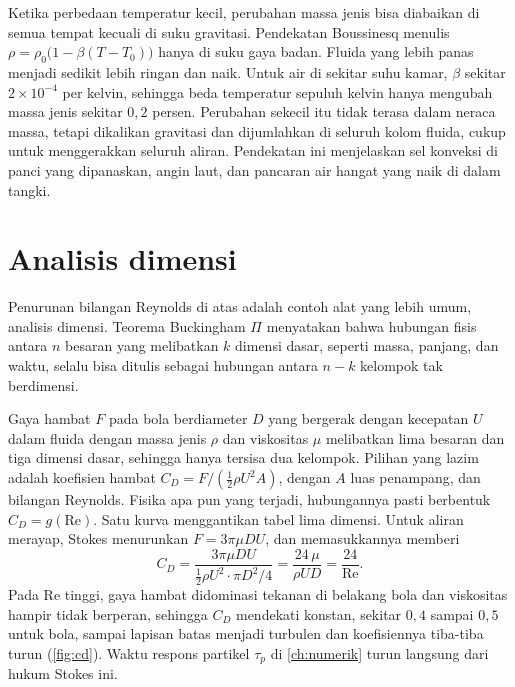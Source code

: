 Ketika perbedaan temperatur kecil, perubahan massa jenis bisa diabaikan di semua tempat kecuali
di suku gravitasi. Pendekatan Boussinesq menulis $\rho=\rho_0\big(1-\beta(T-T_0)\big)$ hanya di suku
gaya badan. Fluida yang lebih panas menjadi sedikit lebih ringan dan naik. Untuk air di sekitar suhu
kamar, $\beta$ sekitar $2\times10^{-4}$ per kelvin, sehingga beda temperatur sepuluh kelvin hanya
mengubah massa jenis sekitar $0{,}2$ persen. Perubahan sekecil itu tidak terasa dalam neraca massa,
tetapi dikalikan gravitasi dan dijumlahkan di seluruh kolom fluida, cukup untuk menggerakkan seluruh
aliran. Pendekatan ini menjelaskan sel konveksi di panci yang dipanaskan, angin laut, dan pancaran air
hangat yang naik di dalam tangki.

\section{Analisis dimensi}

Penurunan bilangan Reynolds di atas adalah contoh alat yang lebih umum, analisis dimensi. Teorema Buckingham $\Pi$
menyatakan bahwa hubungan fisis antara $n$ besaran yang melibatkan $k$ dimensi dasar, seperti massa, panjang, dan waktu,
selalu bisa ditulis sebagai hubungan antara $n-k$ kelompok tak berdimensi.

Gaya hambat $F$ pada bola berdiameter $D$ yang bergerak dengan kecepatan $U$ dalam fluida dengan massa jenis $\rho$ dan
viskositas $\mu$ melibatkan lima besaran dan tiga dimensi dasar, sehingga hanya tersisa dua kelompok. Pilihan yang lazim
adalah koefisien hambat $C_D=F/(\tfrac12\rho U^2A)$, dengan $A$ luas penampang, dan bilangan Reynolds. Fisika apa pun yang
terjadi, hubungannya pasti berbentuk $C_D=g(\mathrm{Re})$. Satu kurva menggantikan tabel lima dimensi. Untuk aliran merayap,
Stokes menurunkan $F=3\pi\mu DU$, dan memasukkannya memberi
\begin{equation}
C_D=\frac{3\pi\mu DU}{\tfrac12\rho U^2\cdot\pi D^2/4}=\frac{24\,\mu}{\rho UD}=\frac{24}{\mathrm{Re}}.
\end{equation}
Pada Re tinggi, gaya hambat didominasi tekanan di belakang bola dan viskositas hampir tidak berperan, sehingga $C_D$
mendekati konstan, sekitar $0{,}4$ sampai $0{,}5$ untuk bola, sampai lapisan batas menjadi turbulen dan koefisiennya tiba-tiba
turun (\cref{fig:cd}). Waktu respons partikel $\tau_p$ di \cref{ch:numerik} turun langsung dari hukum Stokes ini.

